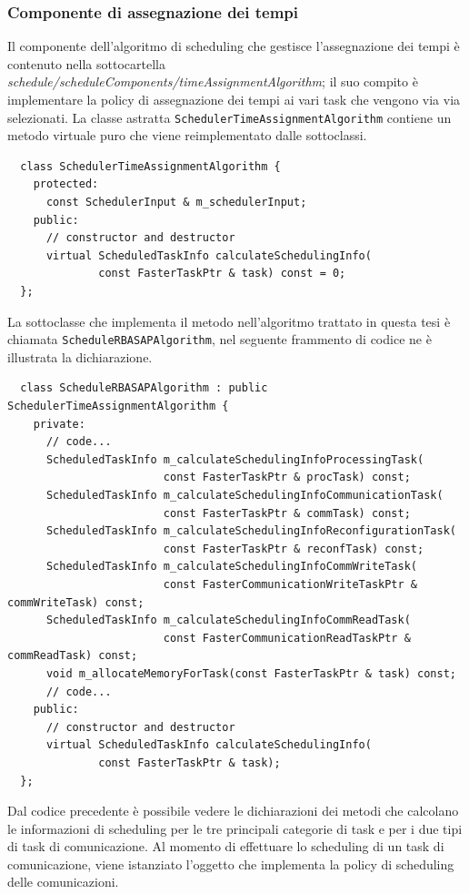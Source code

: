 \subsubsection{Componente di assegnazione dei tempi}
Il componente dell'algoritmo di scheduling che gestisce l'assegnazione dei 
tempi è contenuto nella sottocartella 
\emph{schedule/scheduleComponents/timeAssignmentAlgorithm}; il suo compito è 
implementare la policy di assegnazione dei tempi ai vari task che vengono via 
via selezionati. La classe astratta \verb+SchedulerTimeAssignmentAlgorithm+ 
contiene un metodo virtuale puro che viene reimplementato dalle sottoclassi.
\newline
\begin{verbatim}
  class SchedulerTimeAssignmentAlgorithm {
    protected:
      const SchedulerInput & m_schedulerInput;
    public:
      // constructor and destructor
      virtual ScheduledTaskInfo calculateSchedulingInfo(
              const FasterTaskPtr & task) const = 0;
  };
\end{verbatim}

La sottoclasse che implementa il metodo nell'algoritmo trattato in questa tesi 
è chiamata \verb+ScheduleRBASAPAlgorithm+, nel seguente frammento di codice ne 
è illustrata la dichiarazione.
\newline
\begin{verbatim}
  class ScheduleRBASAPAlgorithm : public SchedulerTimeAssignmentAlgorithm {
    private:
      // code...
      ScheduledTaskInfo m_calculateSchedulingInfoProcessingTask(
                        const FasterTaskPtr & procTask) const;
      ScheduledTaskInfo m_calculateSchedulingInfoCommunicationTask(
                        const FasterTaskPtr & commTask) const;
      ScheduledTaskInfo m_calculateSchedulingInfoReconfigurationTask(
                        const FasterTaskPtr & reconfTask) const;
      ScheduledTaskInfo m_calculateSchedulingInfoCommWriteTask(
                        const FasterCommunicationWriteTaskPtr & commWriteTask) const;
      ScheduledTaskInfo m_calculateSchedulingInfoCommReadTask(
                        const FasterCommunicationReadTaskPtr & commReadTask) const;
      void m_allocateMemoryForTask(const FasterTaskPtr & task) const;
      // code...
    public:
      // constructor and destructor
      virtual ScheduledTaskInfo calculateSchedulingInfo(
              const FasterTaskPtr & task);
  };
\end{verbatim}
Dal codice precedente è possibile vedere le dichiarazioni dei metodi che 
calcolano le informazioni di scheduling per le tre principali categorie di 
task e per i due tipi di task di comunicazione. Al momento di effettuare lo 
scheduling di un task di comunicazione, viene istanziato l'oggetto che 
implementa la policy di scheduling delle comunicazioni.

